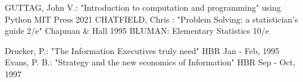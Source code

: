 \documentclass {article}
\begin{document}
\begin{thebibliography}{100}




 GUTTAG, John V.: "Introduction to computation and programming" using Python MIT Press 2021
 CHATFIELD, Chris : "Problem Solving: a statistician's guide 2/e" Chapman & Hall 1995
 BLUMAN: Elementary Statistics 10/e



 Drucker, P.: "The Information Executives truly need" HBR Jan - Feb, 1995
 Evans, P. B.: "Strategy and the new economics of Information" HBR Sep - Oct, 1997


\end{thebibliography}
\end{document}
